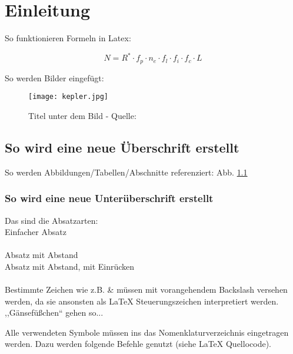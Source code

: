 \chapter{Einleitung}

So funktionieren Formeln in Latex:
\begin{center}
	\begin{equation}
		N = R^{*} \cdot f_{p} \cdot n_{e} \cdot f_{l} \cdot f_{i} \cdot f_{c} \cdot L 
	\end{equation}
\end{center}

\noindent So werden Bilder eingefügt:\\

\begin{figure}[h] %
	\centering
	\label{figure:kepler}
	\texttt{[image: kepler.jpg]} %
	\caption[Kepler (Titel im Abk.-Verzeichnis)]{Titel unter dem Bild - Quelle: \cite{key}}
\end{figure}

\section{So wird eine neue Überschrift erstellt}
So werden Abbildungen/Tabellen/Abschnitte referenziert: Abb. \ref{figure:kepler}\\

\subsection{So wird eine neue Unterüberschrift erstellt}
Das sind die Absatzarten:\\
Einfacher Absatz\\\\
Absatz mit Abstand\\

Absatz mit Abstand, mit Einrücken\\\\

\noindent Bestimmte Zeichen wie z.B. \& müssen mit vorangehendem Backslash versehen werden, da sie ansonsten als LaTeX Steuerungszeichen interpretiert werden. ,,Gänsefüßchen`` gehen so...

\newpage

\noindent Alle verwendeten Symbole müssen ins das Nomenklaturverzeichnis eingetragen werden. Dazu werden folgende Befehle genutzt (siehe LaTeX Quellocode).




